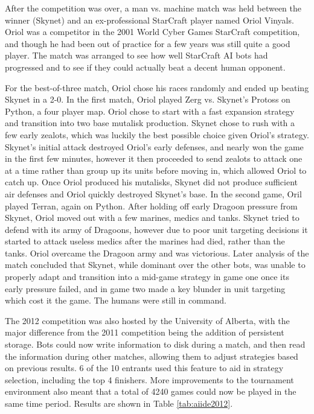 \documentclass[journal]{IEEEtran}
\begin{document}
After the competition was over, a man vs. machine match was held between the winner (Skynet) and an
ex-professional StarCraft player named Oriol Vinyals. Oriol was a competitor in the 2001 World Cyber
Games StarCraft competition, and though he had been out of practice for a few years was still quite a
good player. The match was arranged to see how well StarCraft AI bots had progressed and to see if
they could actually beat a decent human opponent. 

For the best-of-three match, Oriol chose his races randomly and ended up beating Skynet in a 2-0. 
In the first match, Oriol played Zerg vs. Skynet's Protoss on Python, a four player map. Oriol chose
to start with a fast expansion strategy and transition into two base mutalisk production. Skynet chose
to rush with a few early zealots, which was luckily the best possible choice given Oriol's strategy.
Skynet's initial attack destroyed Oriol's early defenses, and nearly won the game in the first few
minutes, however it then proceeded to send zealots to attack one at a time rather than group up its
units before moving in, which allowed Oriol to catch up. Once Oriol produced his mutalisks, Skynet did
not produce sufficient air defenses and Oriol quickly destroyed Skynet's base. In the second game,
Oril played Terran, again on Python. After holding off early Dragoon pressure from Skynet, Oriol
moved out with a few marines, medics and tanks. Skynet tried to defend with its army of Dragoons,
however due to poor unit targeting decisions it started to attack useless medics after the marines
had died, rather than the tanks. Oriol overcame the Dragoon army and was victorious. Later analysis
of the match concluded that Skynet, while dominant over the other bots, was unable to properly
adapt and transition into a mid-game strategy in game one once its early pressure failed, and in game
two made a key blunder in unit targeting which cost it the game. The humans were still in command.

The 2012 competition was also hosted by the University of Alberta, with the major difference from the 2011
competition being the addition of persistent storage. Bots could now write information to disk during a
match, and then read the information during other matches, allowing them to adjust strategies based
on previous results. 6 of the 10 entrants used this feature to aid in strategy selection, including the
top 4 finishers. More improvements to the tournament environment also meant that a total of 4240 games
could now be played in the same time period. Results are shown in Table \ref{tab:aiide2012}.
\end{document}
